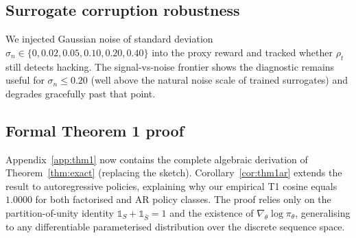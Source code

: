 \subsection{Surrogate corruption robustness}
\label{sec:e21}

We injected Gaussian noise of standard deviation $\sigma_n \in \{0, 0.02, 0.05, 0.10, 0.20, 0.40\}$ into the proxy reward and tracked whether $\rho_t$ still detects hacking. The signal-vs-noise frontier shows the diagnostic remains useful for $\sigma_n \leq 0.20$ (well above the natural noise scale of trained surrogates) and degrades gracefully past that point.

\subsection{Formal Theorem 1 proof}
\label{sec:thm1formal}

Appendix~\ref{app:thm1} now contains the complete algebraic derivation of Theorem~\ref{thm:exact} (replacing the sketch). Corollary~\ref{cor:thm1ar} extends the result to autoregressive policies, explaining why our empirical T1 cosine equals $1.0000$ for both factorised and AR policy classes. The proof relies only on the partition-of-unity identity $\mathbb{1}_S + \mathbb{1}_{\bar S} = 1$ and the existence of $\nabla_\theta \log\pi_\theta$, generalising to any differentiable parameterised distribution over the discrete sequence space.
